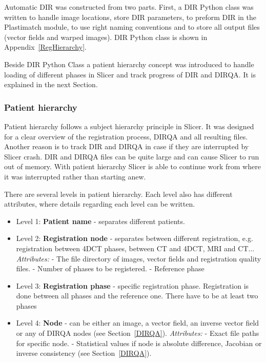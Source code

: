 \documentclass[type=dr, dr=rernat, accentcolor=tud7b,colorbacktitle, bigchapter, openright, twoside, 12pt ]{tudthesis}
\begin{document}
Automatic DIR was constructed from two parts. First, a DIR Python class was written to handle image locations, store DIR parameters, to preform DIR in the Plastimatch module, to use right naming conventions and to store all output files (vector fields and warped images). 
DIR Python class is shown in Appendix~\ref{RegHierarchy}.

Beside DIR Python Class a patient hierarchy concept was introduced to handle loading of different phases in Slicer and track progress of DIR and DIRQA. It is explained in the next Section.


\subsubsection{Patient hierarchy} 
\label{PatHierarchy}

Patient hierarchy follows a subject hierarchy principle in Slicer. It was designed for a clear overview of the registration process, DIRQA and all resulting files. Another reason is to track DIR
and DIRQA in case if they are interrupted by Slicer crash. DIR and DIRQA files can be quite large and can cause Slicer to run out of memory. With patient hierarchy Slicer is able to continue work
from where it was interrupted rather than starting anew.

There are several levels in patient hierarchy. Each level also has different attributes, where details regarding each level can be written.

\begin{itemize}
	\item Level 1: \textbf{Patient name} - separates different patients.
	\item Level 2: \textbf{Registration node} - separates between different registration, e.g. registration between 4DCT phases, between CT and 4DCT, MRI and CT... 
	\subitem \textit{Attributes:}
	\subitem - The file directory of images, vector fields and registration quality files.
	\subitem - Number of phases to be registered.
	\subitem - Reference phase
	\item Level 3: \textbf{Registration phase} - specific registration phase. Registration is done between all phases and the reference one. There have to be at least two phases
	\item Level 4: \textbf{Node} - can be either an image, a vector field, an inverse vector field or any of DIRQA nodes (see Section~\ref{DIRQA}).
	\subitem \textit{Attributes:}
	\subitem - Exact file paths for specific node.
	\subitem - Statistical values if node is absolute difference, Jacobian or inverse consistency (see Section~\ref{DIRQA}).
\end{itemize}
\end{document}
